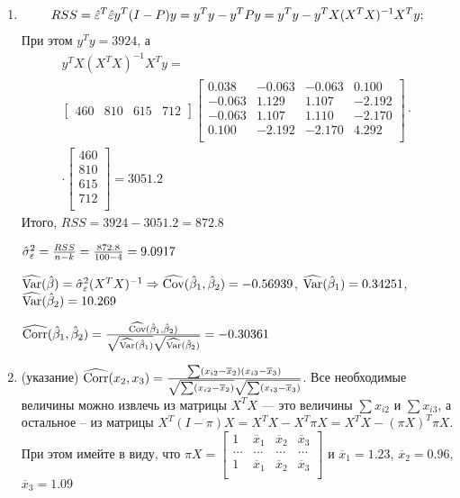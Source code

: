\begin{solution}
\begin{enumerate}
\item 
\begin{multline}
RSS = \hat{\varepsilon}^T\hat{\varepsilon} y^T (I - P) y = y^T y - y^TPy = y^Ty - y^T X(X^TX)^{-1}X^Ty ;
\end{multline}
При этом $y^Ty=3924$,  а
\begin{multline}
y^T X(X^TX)^{-1}X^Ty= \\
 \begin{bmatrix}
460 & 810 & 615 & 712
\end{bmatrix} \begin{bmatrix}
0.038 & -0.063 & -0.063 & 0.100 \\
-0.063 & 1.129 & 1.107 & -2.192 \\
-0.063 & 1.107 & 1.110 & -2.170 \\
0.100 & -2.192 & -2.170 & 4.292 \\
\end{bmatrix} \cdot \\
\cdot 
\begin{bmatrix}
460\\
810\\
615\\
712\\
\end{bmatrix} = 3051.2
\end{multline}
Итого, $RSS= 3924 - 3051.2 = 872.8$
 
$\hat{\sigma}_{\varepsilon}^2 = \frac{RSS}{n-k} = \frac{872.8}{100-4} = 9.0917$

$\widehat{\operatorname{Var}}(\hat{\beta}) = \hat{\sigma}_{\varepsilon}^2 (X^T X)^{-1} \Rightarrow \widehat{\operatorname{Cov}}(\hat{\beta}_1, \hat{\beta}_2) = -0.56939$, $\widehat{\operatorname{Var}}(\hat{\beta}_1) = 0.34251$, $\widehat{\operatorname{Var}}(\hat{\beta}_2) = 10.269$

$\widehat{\operatorname{Corr}}(\hat{\beta}_1, \hat{\beta}_2) = \frac{\widehat{\operatorname{Cov}}(\hat{\beta}_1, \hat{\beta}_2)}{\sqrt{\widehat{\operatorname{Var}}(\hat{\beta}_1)}\sqrt{\widehat{\operatorname{Var}}(\hat{\beta}_2)}} = -0.30361$

\item(указание) $\widehat{\operatorname{Corr}}(x_2, x_3) = \frac{\sum (x_{i2} - \overline{x}_2) (x_{i3} - \overline{x}_3)}{\sqrt{\sum (x_{i2} - \overline{x}_2)}\sqrt{\sum (x_{i3} - \overline{x}_3)}}$. Все необходимые величины можно извлечь из матрицы $X^T X$ --- это величины $\sum x_{i2}$ и $\sum x_{i3}$, а остальное -- из матрицы $X^T (I - \pi) X = X^T X - X^T \pi X = X^T X - (\pi X)^T \pi X$. При этом имейте в виду, что
$\pi X = \begin{bmatrix}
1 & \overline{x}_1 & \overline{x}_2 & \overline{x}_3 \\
\ldots & \ldots & \ldots & \ldots \\
1 & \overline{x}_1 & \overline{x}_2 & \overline{x}_3 \\
\end{bmatrix}$ и $\overline{x}_1 = 1.23$, $\overline{x}_2 = 0.96$, $\overline{x}_3 = 1.09$


\end{enumerate}
\end{solution}
